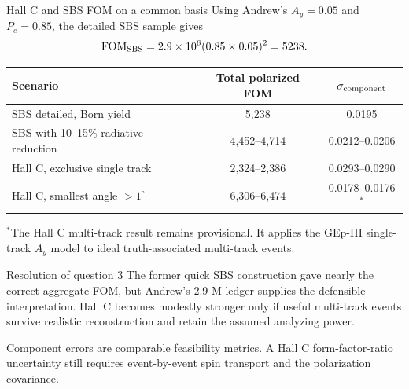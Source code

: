 \documentclass[aspectratio=169,10pt]{beamer}
\begin{document}
\begin{frame}{Hall C and SBS FOM on a common basis}
  \small
  Using Andrew's $A_y=0.05$ and $P_e=0.85$, the detailed SBS sample gives
  \[
    \mathrm{FOM}_{\rm SBS}=2.9\times10^6(0.85\times0.05)^2=5238.
  \]
  \begin{center}
    \renewcommand{\arraystretch}{1.20}
    \begin{tabular}{@{}lcc@{}}
      \toprule
      Scenario & Total polarized FOM & $\sigma_{\rm component}$ \\
      \midrule
      SBS detailed, Born yield & 5,238 & 0.0195 \\
      SBS with 10--15\% radiative reduction & 4,452--4,714 & 0.0212--0.0206 \\
      Hall C, exclusive single track & 2,324--2,386 & 0.0293--0.0290 \\
      Hall C, smallest angle $>1^\circ$ & 6,306--6,474 & 0.0178--0.0176$^{*}$ \\
      \bottomrule
    \end{tabular}
  \end{center}
  \vspace{-0.08cm}
  {\scriptsize $^{*}$The Hall C multi-track result remains provisional. It applies the
  GEp-III single-track $A_y$ model to ideal truth-associated multi-track events.}

  \vspace{0.12cm}
  \begin{block}{Resolution of question 3}
    The former quick SBS construction gave nearly the correct aggregate FOM,
    but Andrew's 2.9 M ledger supplies the defensible interpretation. Hall C
    becomes modestly stronger only if useful multi-track events survive realistic
    reconstruction and retain the assumed analyzing power.
  \end{block}
  {\scriptsize Component errors are comparable feasibility metrics. A Hall C
  form-factor-ratio uncertainty still requires event-by-event spin transport
  and the polarization covariance.}
\end{frame}
\end{document}
